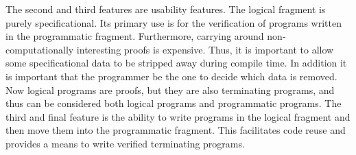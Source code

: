 The second and third features are usability features.  The logical
fragment is purely specificational.  Its primary use is for the
verification of programs written in the programmatic fragment.
Furthermore, carrying around non-computationally interesting proofs is
expensive.  Thus, it is important to allow some specificational data
to be stripped away during compile time.  In addition it is important
that the programmer be the one to decide which data is removed.  Now
logical programs are proofs, but they are also terminating programs,
and thus can be considered both logical programs and programmatic
programs.  The third and final feature is the ability to write
programs in the logical fragment and then move them into the
programmatic fragment.  This facilitates code reuse and provides a
means to write verified terminating programs.

